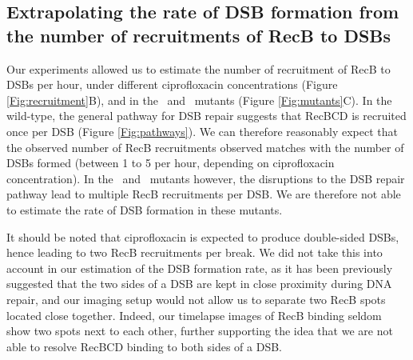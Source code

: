 \subsection*{Extrapolating the rate of DSB formation from the number of recruitments of RecB to DSBs}
Our experiments allowed us to estimate the number of recruitment of RecB to DSBs per hour, under different ciprofloxacin concentrations (Figure \ref{Fig:recruitment}B), and in the \dreca\ and \teneighty\ mutants (Figure \ref{Fig:mutants}C). In the wild-type, the general pathway for DSB repair suggests that RecBCD is recruited once per DSB (Figure \ref{Fig:pathways}). We can therefore reasonably expect that the observed number of RecB recruitments observed matches with the number of DSBs formed (between 1 to 5 per hour, depending on ciprofloxacin concentration). In the \dreca\ and \teneighty\ mutants however, the disruptions to the DSB repair pathway lead to multiple RecB recruitments per DSB. We are therefore not able to estimate the rate of DSB formation in these mutants.

It should be noted that ciprofloxacin is expected to produce double-sided DSBs, hence leading to two RecB recruitments per break. We did not take this into account in our estimation of the DSB formation rate, as it has been previously suggested that the two sides of a DSB are kept in close proximity during DNA repair\cite{Vickridge2017,Keyamura2019}, and our imaging setup would not allow us to separate two RecB spots located close together. Indeed, our timelapse images of RecB binding seldom show two spots next to each other, further supporting the idea that we are not able to resolve RecBCD binding to both sides of a DSB.
